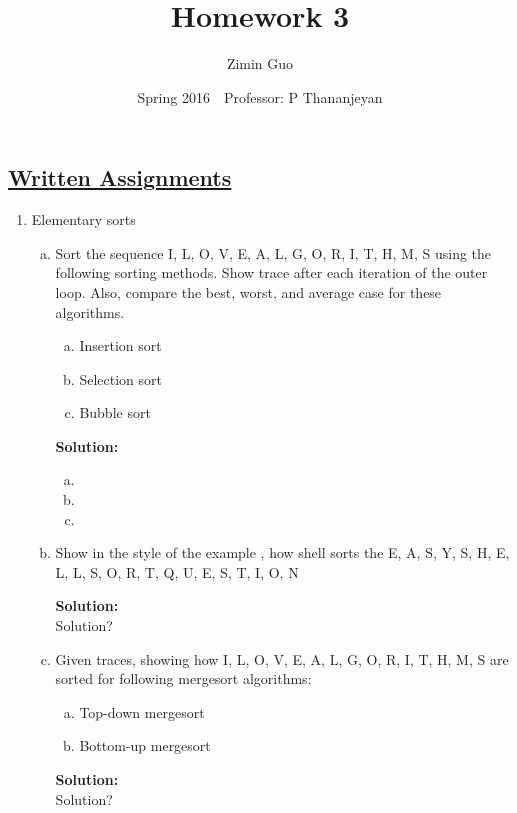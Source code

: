 \documentclass{article}\usepackage{amsmath,amssymb,amsthm,tikz,tkz-graph,color,chngpage,soul,hyperref,csquotes,graphicx,floatrow}\newcommand*{\QEDB}{\hfill\ensuremath{\square}}\newtheorem*{prop}{Proposition}\renewcommand{\theenumi}{\alph{enumi}}\usepackage[shortlabels]{enumitem}\usepackage[nobreak=true]{mdframed}\usetikzlibrary{matrix,calc}\MakeOuterQuote{"}\usepackage[margin=0.75in]{geometry} \newtheorem{theorem}{Theorem}
\title{Homework 3}
\author{Zimin Guo }
\date{Spring 2016$\quad$Professor: P Thananjeyan}
\begin{document}
\maketitle


\subsection*{\underline{Written Assignments}}
\begin{enumerate}[1.]
\item Elementary sorts
\begin{enumerate}[a)]
\item Sort the sequence I, L, O, V, E, A, L, G, O, R, I, T, H, M, S using the following sorting methods. Show trace after each iteration of the outer loop. Also, compare the best, worst, and average case for these algorithms.
\begin{enumerate}[a.]
\item Insertion sort
\item Selection sort
\item Bubble sort
\end{enumerate}
\begin{mdframed}
\textbf{Solution:} 
\begin{enumerate}[a.]
\item
\item
\item
\end{enumerate}
\end{mdframed}

\item Show in the style of the example , how shell sorts the E, A, S, Y, S, H, E, L, L, S, O, R, T, Q, U, E, S, T, I, O, N
\begin{mdframed}
\textbf{Solution:} \\
Solution?
\end{mdframed}

\item Given traces, showing how I, L, O, V, E, A, L, G, O, R, I, T, H, M, S are sorted for following mergesort algorithms:
\begin{enumerate}[a.]
\item Top-down mergesort
\item Bottom-up mergesort
\end{enumerate}
\begin{mdframed}
\textbf{Solution:} \\
Solution?
\end{mdframed}


\end{enumerate}
\end{enumerate}
\end{document}
